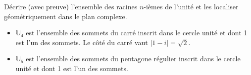 \documentclass{article}
\begin{document}
\begin{question_kholle}{Décrire (avec preuve) l'ensemble des racines $n$-ièmes de l'unité et les localiser géométriquement dans le plan complexe.}
\begin{itemize}
\begin{itemize}[label=$\star$]
            \item $\mathbb U _4$ est l'ensemble des sommets du carré inscrit dans le cercle unité et dont 1 est l'un des sommets. Le côté du carré vaut $\lvert 1 - i\rvert = \sqrt 2$.
            \item $\mathbb U _5$ est l'ensemble des sommets du pentagone régulier inscrit dans le cercle unité et dont 1 est l'un des sommets.
            \begin{figure}[!h]
                \centering
            \end{figure}
        \end{itemize}
    \end{itemize}
    
\end{question_kholle}
\end{document}
